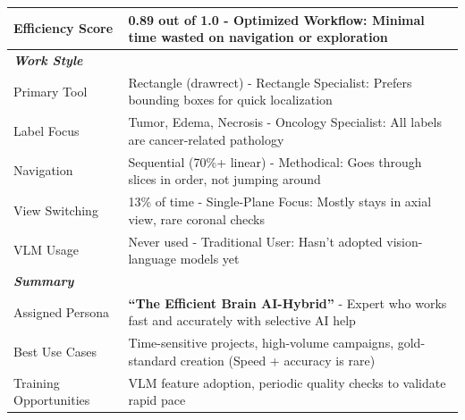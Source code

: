 \documentclass{article}
\begin{document}
\begin{table}[H]
\begin{tabular}{lp{10cm}}
        Efficiency Score & 0.89 out of 1.0 - Optimized Workflow: Minimal time wasted on navigation or exploration \\
        \midrule
        \multicolumn{2}{l}{\textit{\textbf{Work Style}}} \\
        Primary Tool & Rectangle (drawrect) - Rectangle Specialist: Prefers bounding boxes for quick localization \\
        Label Focus & Tumor, Edema, Necrosis - Oncology Specialist: All labels are cancer-related pathology \\
        Navigation & Sequential (70\%+ linear) - Methodical: Goes through slices in order, not jumping around \\
        View Switching & 13\% of time - Single-Plane Focus: Mostly stays in axial view, rare coronal checks \\
        VLM Usage & Never used - Traditional User: Hasn't adopted vision-language models yet \\
        \midrule
        \multicolumn{2}{l}{\textit{\textbf{Summary}}} \\
        Assigned Persona & \textbf{``The Efficient Brain AI-Hybrid''} - Expert who works fast and accurately with selective AI help \\
        Best Use Cases & Time-sensitive projects, high-volume campaigns, gold-standard creation (Speed + accuracy is rare) \\
        Training Opportunities & VLM feature adoption, periodic quality checks to validate rapid pace \\
        \bottomrule
    \end{tabular}
    \label{tab:expert-profile-smith}
\end{table}

\clearpage
\end{document}
